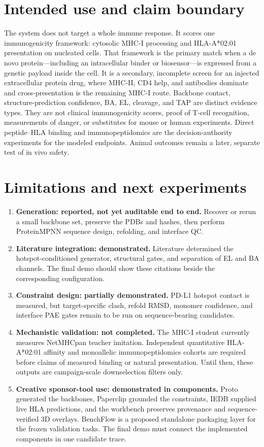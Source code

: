 \documentclass{article}
\begin{document}
\section{Intended use and claim boundary}
The system does not target a whole immune response. It scores one immunogenicity framework: cytosolic MHC-I processing and HLA-A*02:01 presentation on nucleated cells. That framework is the primary match when a de novo protein---including an intracellular binder or biosensor---is expressed from a genetic payload inside the cell. It is a secondary, incomplete screen for an injected extracellular protein drug, where MHC-II, CD4 help, and antibodies dominate and cross-presentation is the remaining MHC-I route. Backbone contact, structure-prediction confidence, BA, EL, cleavage, and TAP are distinct evidence types. They are not clinical immunogenicity scores, proof of T-cell recognition, measurements of danger, or substitutes for mouse or human experiments. Direct peptide--HLA binding and immunopeptidomics are the decision-authority experiments for the modeled endpoints. Animal outcomes remain a later, separate test of in vivo safety.

\section{Limitations and next experiments}
\begin{enumerate}
  \item \textbf{Generation: reported, not yet auditable end to end.} Recover or rerun a small backbone set, preserve the PDBs and hashes, then perform ProteinMPNN sequence design, refolding, and interface QC.
  \item \textbf{Literature integration: demonstrated.} Literature determined the hotspot-conditioned generator, structural gates, and separation of EL and BA channels. The final demo should show these citations beside the corresponding configuration.
  \item \textbf{Constraint design: partially demonstrated.} PD-L1 hotspot contact is measured, but target-specific clash, refold RMSD, monomer confidence, and interface PAE gates remain to be run on sequence-bearing candidates.
  \item \textbf{Mechanistic validation: not completed.} The MHC-I student currently measures NetMHCpan teacher imitation. Independent quantitative HLA-A*02:01 affinity and monoallelic immunopeptidomics cohorts are required before claims of measured binding or natural presentation. Until then, these outputs are campaign-scale downselection filters only.
  \item \textbf{Creative sponsor-tool use: demonstrated in components.} Proto generated the backbones, Paperclip grounded the constraints, IEDB supplied live HLA predictions, and the workbench preserves provenance and sequence-verified 3D overlays. BenchFlow is a proposed standalone packaging layer for the frozen validation tasks. The final demo must connect the implemented components in one candidate trace.
\end{enumerate}



\end{document}
